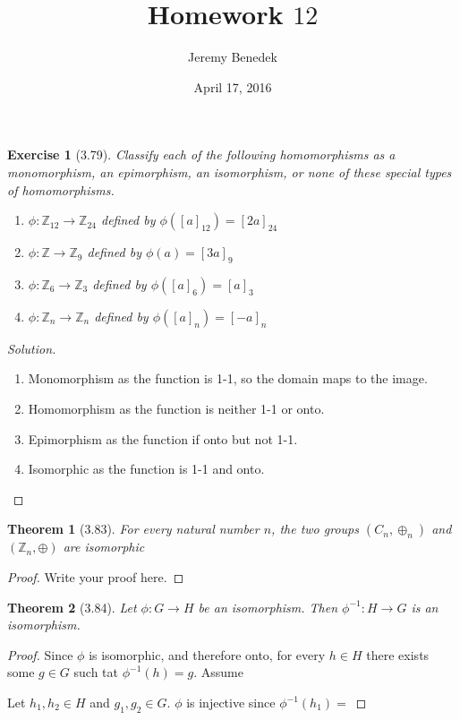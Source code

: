 \documentclass{article}
\title{Homework $12$}
\author{Jeremy  Benedek}
\date{April 17, 2016}
\newtheorem*{thm}{Theorem}
\newtheorem*{ex}{Exercise}
\newenvironment{solution}
  {\begin{proof}[Solution]}
  {\renewcommand{\qedsymbol}{}\end{proof}}
\begin{document}
\maketitle

\begin{ex}[3.79]
Classify each of the following homomorphisms as a monomorphism, an epimorphism, an isomorphism, or none of these special types of homomorphisms. 
\begin{enumerate}
\item $\phi: \mathbb{Z}_{12} \rightarrow \mathbb{Z}_{24}$ defined by $\phi( [a]_{12} ) = [2a]_{24}$
\item $\phi: \mathbb{Z} \rightarrow \mathbb{Z}_{9}$ defined by $\phi(a) = [3a]_{9}$
\item $\phi: \mathbb{Z}_{6} \rightarrow \mathbb{Z}_{3}$ defined by $\phi( [a]_{6} ) = [a]_{3}$
\item $\phi: \mathbb{Z}_{n} \rightarrow \mathbb{Z}_{n}$ defined by $\phi( [a]_{n} ) = [-a]_{n}$
\end{enumerate}
\end{ex}
\begin{solution}
	\begin{enumerate}
	  \item Monomorphism as the function is 1-1, so the domain maps to the image.
	  \item Homomorphism as the function is neither 1-1 or onto. 
	  \item Epimorphism as the function if onto but not 1-1. 
	  \item Isomorphic as the function is 1-1 and onto.
	\end{enumerate}

\end{solution}

\begin{thm}[3.83]
For every natural number $n$, the two groups $(C_n, \oplus_n)$ and $(\mathbb{Z}_n, \oplus)$ are isomorphic\end{thm}
\begin{proof}
    Write your proof here.
\end{proof}

\begin{thm}[3.84]
Let $\phi: G \rightarrow H$ be an isomorphism. Then $\phi^{-1} : H \rightarrow G$ is an isomorphism.\end{thm}
\begin{proof}
  Since $\phi$ is isomorphic, and therefore onto, for every $h \in H$ there exists some $g \in G$ such tat $\phi^{-1}(h) = g$. Assume

  Let $h_1, h_2 \in H$ and $g_1, g_2 \in G$. $\phi$ is injective since $\phi^{-1}(h_1) = $
\end{proof}
\end{document}
